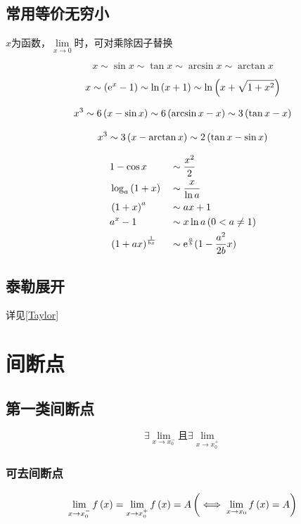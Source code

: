 \documentclass{article}
\begin{document}
\subsection{常用等价无穷小}

$x$为函数，$\lim\limits_{x\to0}$时，可对乘除因子替换

\[x\sim\sin x\sim\tan x\sim\arcsin x\sim\arctan x\]

\[x\sim\left(\mathrm e^x-1\right)\sim\ln\left(x+1\right)\sim\ln\left(x+\sqrt{1+x^2}\right)\]

\[x^3\sim6\left(x-\sin x\right)\sim6\left(\arcsin x-x\right)\sim3\left(\tan x-x\right)\]

\[x^3\sim3\left(x-\arctan x\right)\sim2\left(\tan x -\sin x\right)\]

\[\begin{aligned}
         & 1-\cos x            &  & \sim\frac{x^2}2                    \\
         & \log_a{\left(1+x\right)}     &  & \sim\frac x{\ln a}                 \\
         & \left(1+x\right)^a           &  & \sim ax+1                          \\
         & a^x-1               &  & \sim x\ln a\left(0<a\neq1\right)            \\
         & \left(1+ax\right)^\frac1{bx} &  & \sim\mathrm e^\frac ab(1-\frac{a^2}{2b}x) \\
    \end{aligned}\]

\subsection{泰勒展开}

详见\ref{Taylor}

\section{间断点}

\subsection{第一类间断点}

\[\exists\lim_{x\to x_0^-}\text{且}\exists\lim_{x\to x_0^+}\]

\subsubsection{可去间断点}

\[\lim_{x\to x_0^-}f\left(x\right)=\lim_{x\to x_0^+}f\left(x\right)=A\left(\iff\lim_{x\to x_0}f\left(x\right)=A\right)\]
\end{document}
